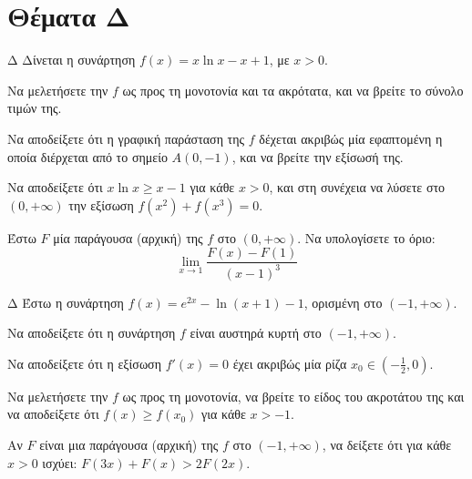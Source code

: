 \section{Θέματα Δ}
\def\xrwma{thirdcolor}
\begin{thema}{Δ}
Δίνεται η συνάρτηση $f(x) = x\ln x - x + 1$, με $x > 0$.
\begin{erwthma}
    \item Να μελετήσετε την $f$ ως προς τη μονοτονία και τα ακρότατα, και να βρείτε το σύνολο τιμών της.
    \item Να αποδείξετε ότι η γραφική παράσταση της $f$ δέχεται ακριβώς μία εφαπτομένη η οποία διέρχεται από το σημείο $A(0, -1)$, και να βρείτε την εξίσωσή της.
    \item Να αποδείξετε ότι $x\ln x \ge x - 1$ για κάθε $x > 0$, και στη συνέχεια να λύσετε στο $(0, +\infty)$ την εξίσωση $f(x^2) + f(x^3) = 0$.
    \item Έστω $F$ μία παράγουσα (αρχική) της $f$ στο $(0, +\infty)$. Να υπολογίσετε το όριο:
    \[ \lim_{x\to 1} \frac{F(x) - F(1)}{(x-1)^3} \]
\end{erwthma}
\end{thema}


\begin{thema}{Δ}
Έστω η συνάρτηση $f(x) = e^{2x} - \ln(x+1) - 1$, ορισμένη στο $(-1, +\infty)$.
\begin{erwthma}
    \item Να αποδείξετε ότι η συνάρτηση $f$ είναι αυστηρά κυρτή στο $(-1, +\infty)$.
    \item Να αποδείξετε ότι η εξίσωση $f'(x) = 0$ έχει ακριβώς μία ρίζα $x_0 \in \left(-\frac{1}{2}, 0\right)$.
    \item Να μελετήσετε την $f$ ως προς τη μονοτονία, να βρείτε το είδος του ακροτάτου της και να αποδείξετε ότι $f(x) \ge f(x_0)$ για κάθε $x > -1$.
    \item Αν $F$ είναι μια παράγουσα (αρχική) της $f$ στο $(-1, +\infty)$, να δείξετε ότι για κάθε $x > 0$ ισχύει: $F(3x) + F(x) > 2F(2x)$.
\end{erwthma}
\end{thema}

